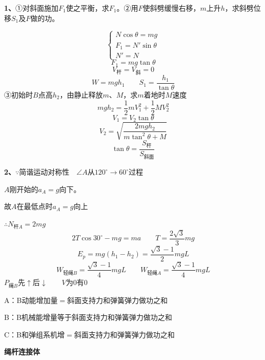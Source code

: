\begin{problem}[1]
\textbf{1、}①对斜面施加$F_1$使之平衡，求$F_1$。②用$F$使斜劈缓慢右移，$m$上升$h$，求斜劈位移$S_1$及$F$做的功。%
\begin{solution}
\[ \begin{cases}
N\cos\theta=mg\\
F_1=N'\sin\theta\\
N'=N
\end{cases} \]
\[ F_1=mg\tan\theta \]
\[ V_{\text{杆}}=V_{\text{斜}}=0 \]
\[ W=mgh_1\qquad S_1=\dfrac{h_1}{\tan\theta} \]
③初始时$B$点高$h_2$，由静止释放$m$、$M$，求$m$着地时$M$速度
\[ mgh_2=\dfrac{1}{2}mV_1^2+\dfrac{1}{2}MV_2^2 \]
\[ V_1=V_2\tan\theta \]
\[ V_2=\sqrt{\dfrac{2mgh_2}{m\tan^2\theta+M}} \]
\[ \tan\theta=\dfrac{S_{\text{杆}}}{S_{\text{斜面}}} \]
\end{solution}
\end{problem}
\begin{problem}[2]
\textbf{2、}$\because$简谐运动对称性　$\angle A$从$120^\circ\to60^\circ$过程
\begin{solution}
$A$刚开始的$a_A=g$向下。

故$A$在最低点时$a_A=g$向上

$\therefore N_{\text{杆}A}=2mg$
\[ 2T\cos30^\circ-mg=ma\qquad T=\dfrac{2\sqrt{3}}{3}mg \]
\[ E_p=mg(h_1-h_2)=\dfrac{\sqrt{3}-1}{2}mgL \]
\[ W_{\text{轻绳}B}=\dfrac{\sqrt{3}-1}{4}mgL\qquad W_{\text{轻绳}A}=\dfrac{\sqrt{3}-1}{4}mgL \]
$P_{\text{绳}B}$先$\uparrow$后$\downarrow$　　$V$为0有0
\end{solution}
\end{problem}
\begin{problem}
\noindent A：B动能增加量$=$斜面支持力和弹簧弹力做功之和　%

\noindent B：B机械能增量等于斜面支持力和弹簧弹力做功之和　\red{$\checkmark$}

\noindent C：B和弹组系机增$=$斜面支持力和弹簧弹力做功之和　\red{$\checkmark$}%
\end{problem}
\textbf{绳杆连接体}

